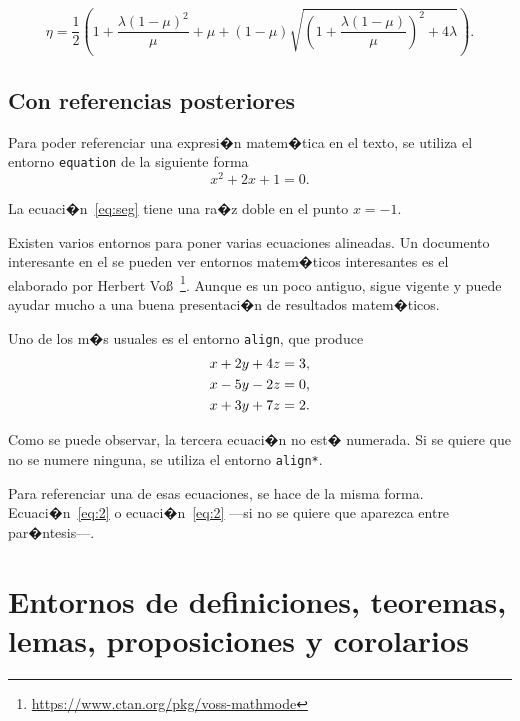 \documentclass[a4paper,12pt,%
]{memoir}
\begin{document}
\[
\eta= \frac{1}{2}\left( 1+\frac{\lambda (1-\mu )^2}{\mu } +\mu +
  (1-\mu) \sqrt{\left( 1+\frac{\lambda (1-\mu)}{\mu} \right)^2+
    4\lambda }\right).
\]

\subsection{Con referencias posteriores}
Para poder referenciar una expresi�n matem�tica en el texto, se
utiliza el entorno \texttt{equation} de la siguiente forma
\begin{equation}
  \label{eq:seg}
  x^2+2x+1=0.
\end{equation}
\par
La ecuaci�n~\eqref{eq:seg} tiene una ra�z doble en el punto $x=-1$.
\par
Existen varios entornos para poner varias ecuaciones alineadas. Un
documento interesante en el se pueden ver entornos matem�ticos
interesantes es el elaborado por Herbert
Vo\ss~\footnote{\url{https://www.ctan.org/pkg/voss-mathmode}}. Aunque
es un poco antiguo, sigue vigente y puede ayudar mucho a una buena
presentaci�n de resultados matem�ticos.
\par
Uno de los m�s usuales es el entorno \texttt{align}, que produce
\begin{align}
  \label{eq:1} x+ 2y + 4z &=3, \\
  \label{eq:2} x- 5y - 2z &=0, \\
  x+ 3y + 7z &=2. \notag
\end{align}
\par
Como se puede observar, la tercera ecuaci�n no est� numerada. Si se
quiere que no se numere ninguna, se utiliza el entorno
\texttt{align*}.
\par
Para referenciar una de esas ecuaciones, se hace de la misma forma.
Ecuaci�n~\eqref{eq:2} o ecuaci�n~\ref{eq:2} ---si no se quiere que
aparezca entre par�ntesis---.

\section{Entornos de definiciones, teoremas, lemas, proposiciones y corolarios}
\end{document}
